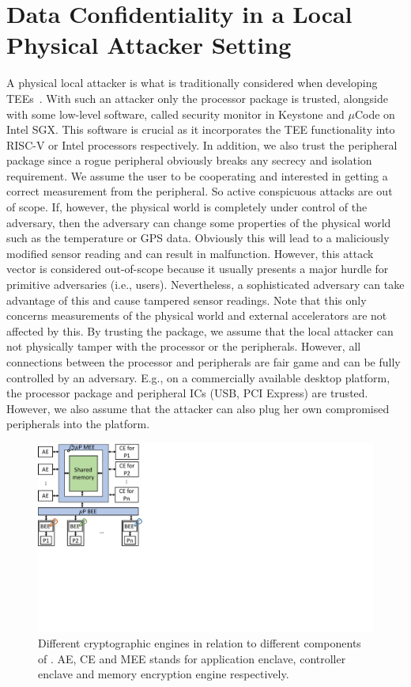 
\section{Data Confidentiality in a Local Physical Attacker Setting}
\label{pie:sec:localAttacker}


A physical local attacker is what is traditionally considered when developing TEEs~\cite{costan2016intel,keystone}. With such an attacker only the processor package is trusted, alongside with some low-level software, called security monitor in Keystone and $\mu$Code on Intel SGX. This software is crucial as it incorporates the TEE functionality into RISC-V or Intel processors respectively. In addition, we also trust the peripheral package since a rogue peripheral obviously breaks any secrecy and isolation requirement. We assume the user to be cooperating and interested in getting a correct measurement from the peripheral. So active conspicuous attacks are out of scope.  If, however, the physical world is completely under control of the adversary, then the adversary can change some properties of the physical world such as the temperature or GPS data. Obviously this will lead to a maliciously modified sensor reading and can result in malfunction. However, this attack vector is considered out-of-scope because it usually presents a major hurdle for primitive adversaries (i.e., users). Nevertheless, a sophisticated adversary can take advantage of this and cause tampered sensor readings. Note that this only concerns measurements of the physical world and external accelerators are not affected by this. By trusting the package, we assume that the local attacker can not physically tamper with the processor or the peripherals. However, all connections between the processor and peripherals are fair game and can be fully controlled by an adversary. E.g., on a commercially available desktop platform, the processor package and peripheral ICs (USB, PCI Express) are trusted. However, we also assume that the attacker can also plug her own compromised peripherals into the platform. 



  \begin{figure}[tbp]
   \centering
   \includegraphics[trim={0 8.5cm 23cm 0}, clip, width=0.5\linewidth]{chapters/PIE/images/memoryEnc.pdf}
   \caption[Different cryptographic engines in \name]{Different cryptographic engines in relation to different components of \name. AE, CE and MEE stands for application enclave, controller enclave and memory encryption engine respectively.}
   \label{fig:encEngine}
  \end{figure}

